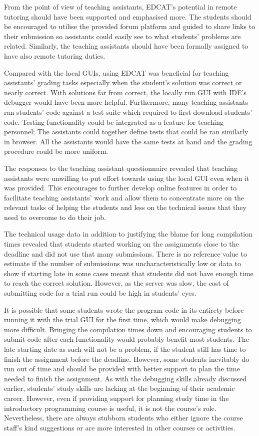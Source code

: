 From the point of view of teaching assistants, EDCAT's potential in remote tutoring should have been supported and emphasised more. The students should be encouraged to utilise the provided forum platform and guided to share links to their submission so assistants could easily see to what students' problems are related. Similarly, the teaching assistants should have been formally assigned to have also remote tutoring duties.

Compared with the local GUIs, using EDCAT was beneficial for teaching assistants' grading tasks especially when the student's solution was correct or nearly correct. With solutions far from correct, the locally run GUI with IDE's debugger would have been more helpful. Furthermore, many teaching assistants ran students' code against a test suite which required to first download students' code. Testing functionality could be integrated as a feature for teaching personnel; The assistants could together define tests that could be ran similarly in browser. All the assistants would have the same tests at hand and the grading procedure could be more uniform.

The responses to the teaching assistant questionnaire revealed that teaching assistants were unwilling to put effort towards using the local GUI even when it was provided. This encourages to further develop online features in order to facilitate teaching assistants' work and allow them to concentrate more on the relevant tasks of helping the students and less on the technical issues that they need to overcome to do their job.

The technical usage data in addition to justifying the blame for long compilation times revealed that students started working on the assignments close to the deadline and did not use that many submissions. There is no reference value to estimate if the number of submissions was uncharacteristically low or data to show if starting late in some cases meant that students did not have enough time to reach the correct solution. However, as the server was slow, the cost of submitting code for a trial run could be high in students' eyes.

It is possible that some students wrote the program code in its entirety before running it with the trial GUI for the first time, which would make debugging more difficult. Bringing the compilation times down and encouraging students to submit code after each functionality would probably benefit most students. The late starting date as such will not be a problem, if the student still has time to finish the assignment before the deadline. However, some students inevitably do run out of time and should be provided with better support to plan the time needed to finish the assignment. As with the debugging skills already discussed earlier, students' study skills are lacking at the beginning of their academic career. However, even if providing support for planning study time in the introductory programming course is useful, it is not the course's role. Nevertheless, there are always stubborn students who either ignore the course staff's kind suggestions or are more interested in other courses or activities. 

